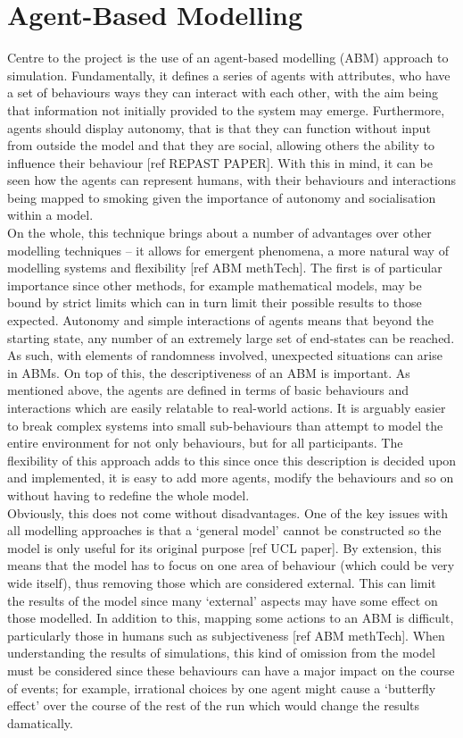 \documentclass[]{report}
\begin{document}
\section{Agent-Based Modelling}
Centre to the project is the use of an agent-based modelling (ABM) approach to simulation. Fundamentally, it defines a series of agents with attributes, who have a set of behaviours  ways they can interact with each other, with the aim being that information not initially provided to the system may emerge. Furthermore, agents should display autonomy, that is that they can function without input from outside the model and that they are social, allowing others the ability to influence their behaviour [ref REPAST PAPER]. With this in mind, it can be seen how the agents can represent humans, with their behaviours and interactions being mapped to smoking given the importance of autonomy and socialisation within a model. \\
On the whole, this technique brings about a number of advantages over other modelling techniques – it allows for emergent phenomena, a more natural way of modelling systems and flexibility [ref ABM methTech]. The first is of particular importance since other methods, for example mathematical models, may be bound by strict limits which can in turn limit their possible results to those expected. Autonomy and simple interactions of agents means that beyond the starting state, any number of an extremely large set of end-states can be reached. As such, with elements of randomness involved, unexpected situations can arise in ABMs. 
On top of this, the descriptiveness of an ABM is important. As mentioned above, the agents are defined in terms of basic behaviours and interactions which are easily relatable to real-world actions. It is arguably easier to break complex systems into small sub-behaviours than attempt to model the entire environment for not only behaviours, but for all participants. The flexibility of this approach adds to this since once this description is decided upon and implemented, it is easy to add more agents, modify the behaviours and so on without having to redefine the whole model.\\
Obviously, this does not come without disadvantages. One of the key issues with all modelling approaches is that a `general model' cannot be constructed so the model is only useful for its original purpose [ref UCL paper]. By extension, this means that the model has to focus on one area of behaviour (which could be very wide itself), thus removing those which are considered external. This can limit the results of the model since many `external' aspects may have some effect on those modelled. In addition to this, mapping some actions to an ABM is difficult, particularly those in humans such as subjectiveness [ref ABM methTech]. When understanding the results of simulations, this kind of omission from the model must be considered since these behaviours can have a major impact on the course of events; for example, irrational choices by one agent might cause a `butterfly effect' over the course of the rest of the run which would change the results damatically. \\
\end{document}

